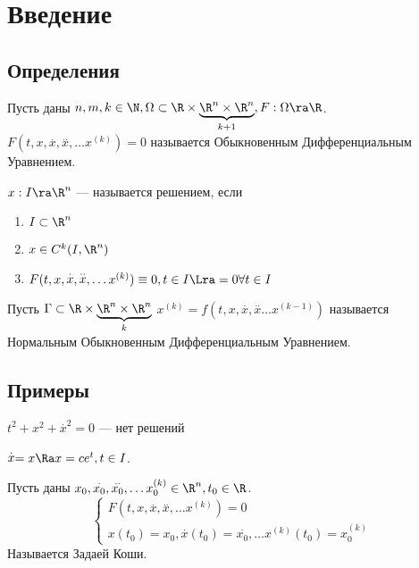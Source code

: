 
\section{Введение}
\subsection{Определения}
\begin{definition}
    Пусть даны \(n, m, k \in \N, \Omega \subset \R \times \underbrace{\R^n \times \R^n}_{k + 1}, F: \Omega \ra \R\). \(F(t, x, \stackrel{.}{x}, \stackrel{..}{x}, \dots x^{(k)}) = 0\) называется Обыкновенным Дифференциальным Уравнением.
\end{definition}

\begin{definition}
    \(x: I \ra \R^n\) --- называется решением, если
    \begin{enumerate}
        \item \(I \subset \R^n\)
        \item \(x \in C^k(I, \R^n)\)
        \item \(F(t, x, \stackrel{.}{x}, \stackrel{..}{x}, \dots x^{(k)}) \equiv 0, t \in I \Lra = 0 \forall t \in I 
        \)
    \end{enumerate}
\end{definition}

\begin{definition}
    Пусть \(\Gamma \subset \R \times \underbrace{\R^n \times \R^n}_{k}\)
    \(x^{(k)} = f(t, x, \stackrel{.}{x}, \stackrel{..}{x} \dots x^{(k - 1)})\) называется Нормальным Обыкновенным Дифференциальным Уравнением.
\end{definition}

\subsection{Примеры}
\begin{example}
    \(t^2 + x^2 + \stackrel{.}{x}^2 = 0\) --- нет решений
\end{example}

\begin{example}
    \(\stackrel{.}{x} = x \Ra x = ce^t, t \in I\).
\end{example}

\begin{definition}
    Пусть даны \(x_0, \stackrel{.}{x_0}, \stackrel{..}{x_0}, \dots x_0^{(k)} \in \R^n, t_0 \in \R\).
    \begin{equation}
        \begin{cases}
            F(t, x, \stackrel{.}{x}, \stackrel{..}{x}, \dots x^{(k)}) = 0\\
            x(t_0) = x_0,  \stackrel{.}{x}(t_0) = \stackrel{.}{x_0}, \dots x^{(k)}(t_0) = x_0^{(k)}    
        \end{cases}
    \end{equation}
    Называется Задаей Коши.
\end{definition}

